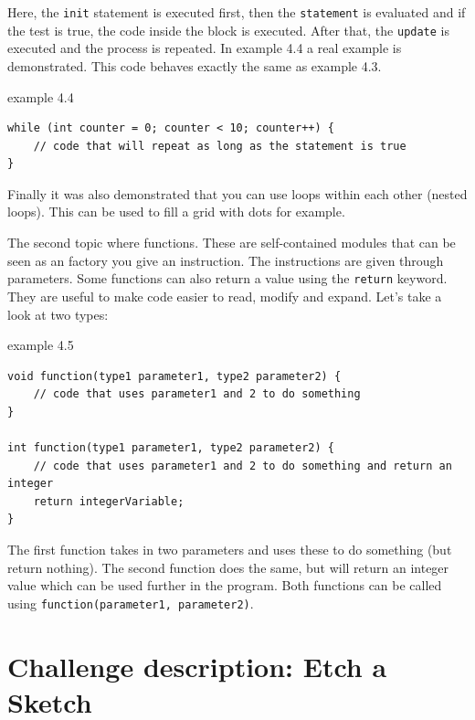 Here, the \texttt{init} statement is executed first, then the \texttt{statement} is evaluated and if the test is true, the code inside the block is executed. After that, the \texttt{update} is executed and the process is repeated. In example 4.4 a real example is demonstrated. This code behaves exactly the same as example 4.3.

\begin{codebox}{example 4.4}
    \begin{lstlisting}
while (int counter = 0; counter < 10; counter++) {
    // code that will repeat as long as the statement is true
}
    \end{lstlisting}
\end{codebox}

Finally it was also demonstrated that you can use loops within each other (nested loops). This can be used to fill a grid with dots for example.

\medskip

The second topic where functions. These are self-contained modules that can be seen as an factory you give an instruction. The instructions are given through parameters. Some functions can also return a value using the \texttt{return} keyword. They are useful to make code easier to read, modify and expand. Let's take a look at two types:

\begin{codebox}{example 4.5}
    \begin{lstlisting}
void function(type1 parameter1, type2 parameter2) {
    // code that uses parameter1 and 2 to do something
}

int function(type1 parameter1, type2 parameter2) {
    // code that uses parameter1 and 2 to do something and return an integer
    return integerVariable;
}
    \end{lstlisting}
\end{codebox}

The first function takes in two parameters and uses these to do something (but return nothing). The second function does the same, but will return an integer value which can be used further in the program. Both functions can be called using \texttt{function(parameter1, parameter2)}.

\section{Challenge description: Etch a Sketch}

